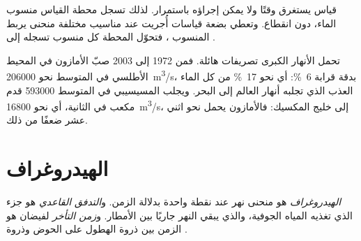 قياس  يستغرق وقتًا ولا يمكن إجراؤه باستمرار. لذلك تسجل محطة القياس
منسوب الماء، دون انقطاع. وتعطي بضعة قياسات  أُجريت عند مناسيب مختلفة
منحنى يربط المنسوب ، فتحوّل المحطة كل منسوب تسجله إلى
.

تحمل الأنهار الكبرى تصريفات هائلة. فمن 1972 إلى 2003 صبّ الأمازون في المحيط
الأطلسي في المتوسط نحو \qty{206000}{m^3/s}، بدقة قرابة
\qty{6}{\percent}: أي نحو \qty{17}{\percent} من كل الماء العذب الذي تجلبه
أنهار العالم إلى البحر. ويجلب المسيسيبي في المتوسط
\num{593000} قدم مكعب في الثانية، أي نحو \qty{16800}{m^3/s}، إلى خليج
المكسيك: فالأمازون يحمل نحو اثني عشر ضعفًا من ذلك.

\section{الهيدروغراف}

\begin{definition}\label{def:g10:drainage-basins:hydrograph}
\emph{الهيدروغراف} هو منحنى  نهر عند نقطة واحدة بدلالة
الزمن. و\emph{التدفق القاعدي} هو جزء  الذي تغذيه المياه
الجوفية، والذي يبقي النهر جاريًا بين الأمطار. و\emph{زمن التأخر}
لفيضان هو الزمن بين ذروة الهطول على الحوض وذروة
.
\end{definition}

